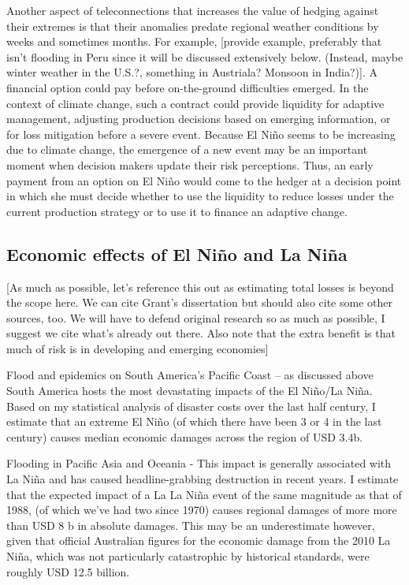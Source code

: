 \documentclass[authoryear]{article}
\begin{document}
Another aspect of teleconnections that increases the value of hedging against their extremes is that their anomalies predate regional weather conditions by weeks and sometimes months. For example, [provide example, preferably that isn't flooding in Peru since it will be discussed extensively below. (Instead, maybe winter weather in the U.S.?, something in Austriala? Monsoon in India?)]. A financial option could pay before on-the-ground difficulties emerged. In the context of climate change, such a contract could provide liquidity for adaptive management, adjusting production decisions based on emerging information, or for loss mitigation before a severe event. Because El Ni\~no seems to be increasing due to climate change, the emergence of a new event may be an important moment when decision makers update their risk perceptions. Thus, an early payment from an option on El Ni\~no would come to the hedger at a decision point in which she must decide whether to use the liquidity to reduce losses under the current production strategy or to use it to finance an adaptive change.

\subsection{Economic effects of El Ni\~no and La Ni\~na}
[As much as possible, let's reference this out as estimating total losses is beyond the scope here. We can cite Grant's dissertation but should also cite some other sources, too. We will have to defend original research so as much as possible, I suggest we cite what's already out there. Also note that the extra benefit is that much of risk is in developing and emerging economies]

Flood and epidemics on South America's Pacific Coast – as discussed above South America hosts the most devastating impacts of the El Ni\~no/La Ni\~na. Based on my statistical analysis of disaster costs over the last half century, I estimate that an extreme El Ni\~no (of which there have been 3 or 4 in the last century) causes median economic damages across the region of USD 3.4b.

Flooding in Pacific Asia and Oceania - This impact is generally associated with La Ni\~na and has caused headline-grabbing destruction in recent years. I estimate that the expected impact of a La La Ni\~na event of the same magnitude as that of 1988, (of which we’ve had two since 1970) causes regional damages of more more than USD 8 b in absolute damages. This may be an underestimate however, given that official Australian figures for the economic damage from the 2010 La Ni\~na, which was not particularly catastrophic by historical standards, were roughly USD 12.5 billion. 
\end{document}

